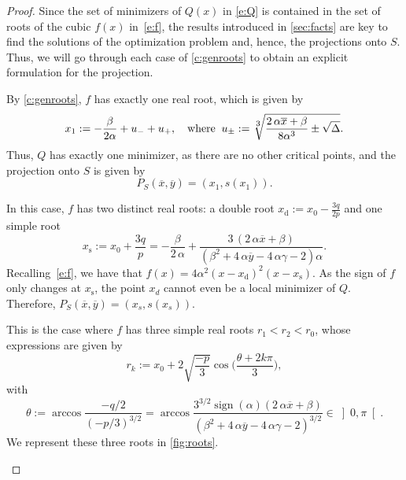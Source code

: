 \documentclass[11pt]{article}
\newcommand{\px}{\overline{x}}
\newcommand{\py}{\overline{y}}
\begin{document}
\begin{proof}
Since the set of minimizers of $Q(x)$ in \cref{e:Q} is contained in the set of roots of the cubic $f(x)$ in~\cref{e:f}, the results introduced in \cref{sec:facts} are key to find the solutions of the optimization problem and, hence, the projections onto $S$. Thus, we will go through each case of \cref{c:genroots} to obtain an explicit formulation for the projection.

\noindent{} By \cref{c:genroots}, $f$ has exactly one real root, which is given by
\begin{equation}
x_1 := -\frac{\beta}{2\alpha}+u_-+u_+,\quad
\text{where}\;\;
u_{\pm} := \sqrt[\mathlarger 3]{\frac{2\,\alpha\px+\beta}{8\alpha^3}\pm \sqrt{\Delta}}. 
\end{equation}
Thus, $Q$ has exactly one minimizer, as there are no other critical points, and the projection onto $S$ is given by
\begin{equation*}
P_S(\px,\py) = (x_1,s(x_1)).
\end{equation*}

\noindent{} In this case, $f$ has two distinct real roots: a double root $x_\text{d} := x_0-\frac{3q}{2p}$ and one simple root
\[x_\text{s}:= x_0+\frac{3q}{p}= 
-\frac{\beta}{2 \, \alpha} + 
\frac{3 \, {\left(2 \, \alpha \px + \beta\right)}}{{\left(\beta^{2} + 4 \, \alpha \py - 4 \, \alpha \gamma - 2\right)} \alpha}.\]
Recalling~\cref{e:f}, we have that $f(x)=4\alpha^2(x-x_\text{d})^2(x-x_\text{s})$. As the sign of $f$ only changes at $x_\text{s}$, the point $x_d$ cannot even be a local minimizer of $Q$. Therefore, $P_S(\px,\py)=(x_s,s(x_s))$.

\noindent{} This is the case where $f$ has three simple real roots
$r_1<r_2<r_0$, whose expressions are given by  
\begin{equation}\label{e:rk}
r_k := x_0+2\sqrt{\frac{-p}{3}}\cos\Big(\frac{\theta+2k\pi}{3} \Big),
\end{equation}
with
\begin{equation}\label{e:theta2}
\theta := \arccos \frac{-q/2}{(-p/3)^{3/2}}=\arccos \frac{3^{3/2}\operatorname{sign}(\alpha)(2\,\alpha\px+\beta)}{(\beta^{2} + 4 \, \alpha \py - 4 \, \alpha \gamma - 2)^{3/2}}\in\left]0,\pi\right[. 
\end{equation}
We represent these three roots in \cref{fig:roots}.

\begin{figure}[ht]
\centering
{}
\end{figure}
\end{proof}
\end{document}
